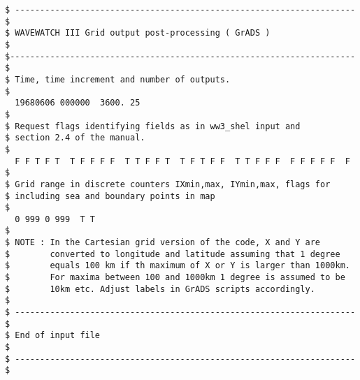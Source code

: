 \begin{verbatim}
$ -------------------------------------------------------------------- $
$ WAVEWATCH III Grid output post-processing ( GrADS )                  $
$--------------------------------------------------------------------- $
$ Time, time increment and number of outputs.
$
  19680606 000000  3600. 25
$
$ Request flags identifying fields as in ww3_shel input and
$ section 2.4 of the manual.
$
  F F T F T  T F F F F  T T F F T  T F T F F  T T F F F  F F F F F  F
$
$ Grid range in discrete counters IXmin,max, IYmin,max, flags for
$ including sea and boundary points in map
$
  0 999 0 999  T T
$
$ NOTE : In the Cartesian grid version of the code, X and Y are
$        converted to longitude and latitude assuming that 1 degree
$        equals 100 km if th maximum of X or Y is larger than 1000km.
$        For maxima between 100 and 1000km 1 degree is assumed to be
$        10km etc. Adjust labels in GrADS scripts accordingly.
$
$ -------------------------------------------------------------------- $
$ End of input file                                                    $
$ -------------------------------------------------------------------- $
\end{verbatim}
